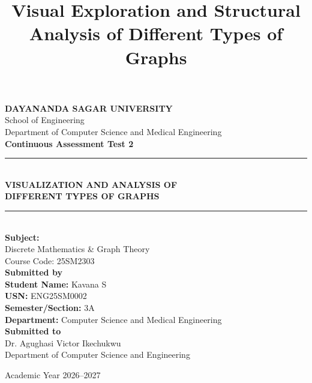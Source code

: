 \documentclass[12pt,a4paper]{article}
\title{\textbf{Visual Exploration and Structural Analysis of Different Types of Graphs} }
\begin{document}
\justifying

\begin{titlepage}
\begin{center}

\vspace*{0.5cm}

{\Large\textbf{DAYANANDA SAGAR UNIVERSITY}}\\[0.2cm]

{\normalsize School of Engineering}\\
{\normalsize Department of Computer Science and Medical Engineering}\\[1.2cm]

{\Large\textbf{Continuous  Assessment Test 2 }}\\[0.5cm]

\rule{\textwidth}{1 pt}\\[0.4cm]

{\LARGE\bfseries VISUALIZATION AND ANALYSIS OF}\\[0.2cm]
{\LARGE\bfseries DIFFERENT TYPES OF GRAPHS}\\[0.4cm]

\rule{\textwidth}{1 pt}\\[1cm]

{\large\textbf{Subject:}}\\[0.2cm]
{\large Discrete Mathematics \& Graph Theory}\\[0.2cm]
{\large Course Code: 25SM2303}\\[1cm]

\textbf{Submitted by}\\[0.3cm]

\textbf{Student Name:} Kavana S\\
\textbf{USN:}  ENG25SM0002\\
\textbf{Semester/Section:}  3A\\
\textbf{Department:} Computer Science and  Medical Engineering\\[1cm]

\textbf{Submitted to}\\[0.3cm]

Dr. Agughasi Victor Ikechukwu\\
Department of Computer Science and Engineering\\[1cm]

\vfill

{\large Academic Year 2026--2027}

\end{center}
\end{titlepage}
\end{document}
